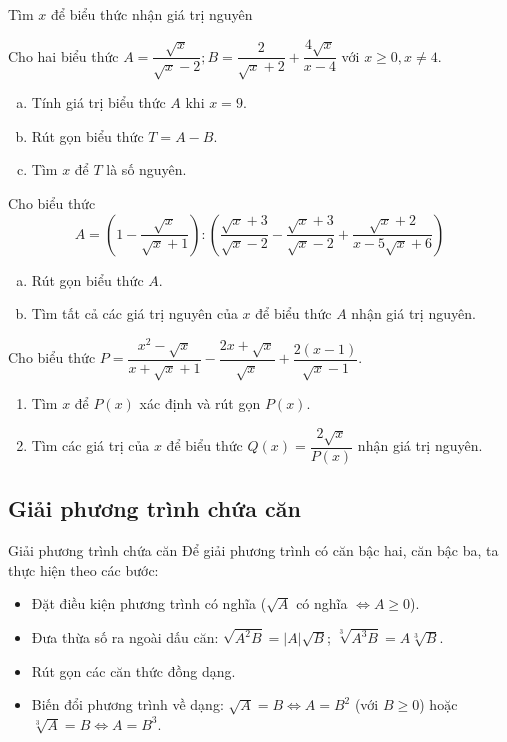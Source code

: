 \begin{dang}{Tìm $x$ để biểu thức nhận giá trị nguyên}

\end{dang}
\begin{vd}
	Cho hai biểu thức $A=\dfrac{\sqrt{x}}{\sqrt{x}-2};B=\dfrac{2}{\sqrt{x}+2}+\dfrac{4\sqrt{x}}{x-4}$ với $x\geq0,x\neq4$.
	\begin{enumerate}[a)]
		\item Tính giá trị biểu thức $A$ khi $x=9$.
		\item Rút gọn biểu thức $T=A-B$.
		\item Tìm $x$ để $T$ là số nguyên.
	\end{enumerate}

\end{vd}
\begin{vd}
	Cho biểu thức $$A=\left(1-\dfrac{\sqrt{x}}{\sqrt{x}+1}\right):\left(\dfrac{\sqrt{x}+3}{\sqrt{x}-2}-\dfrac{\sqrt{x}+3}{\sqrt{x}-2}+\dfrac{\sqrt{x}+2}{x-5\sqrt{x}+6}\right)$$
	\begin{enumerate}[a)]
		\item Rút gọn biểu thức $A$.
		\item Tìm tất cả các giá trị nguyên của $x$ để biểu thức $A$ nhận giá trị nguyên.
	\end{enumerate}

\end{vd}
\begin{vd}
	\hfill
	Cho biểu thức $P = \dfrac{x^2-\sqrt{x}}{x+\sqrt{x}+1}-\dfrac{2x+\sqrt{x}}{\sqrt{x}}+\dfrac{2(x-1)}{\sqrt{x}-1}$.
	\begin{enumerate}
		\item Tìm $x$ để $P(x)$ xác định và rút gọn $P(x)$.
		\item Tìm các giá trị của $x$ để biểu thức $Q(x) = \dfrac{2\sqrt{x}}{P(x)}$ nhận giá trị nguyên.
	\end{enumerate}
\end{vd}
\subsection{Giải phương trình chứa căn}

\begin{dang}{Giải phương trình chứa căn}
	Để giải phương trình có căn bậc hai, căn bậc ba, ta thực hiện theo các bước:
	\begin{itemize}
		\item Đặt điều kiện phương trình có nghĩa ($\sqrt{A}$ có nghĩa $\Leftrightarrow A\geq 0$).
		\item Đưa thừa số ra ngoài dấu căn: $\sqrt{A^2B}=|A|\sqrt{B}$; $\sqrt[3]{A^3B}=A\sqrt[3]{B}$.
		\item Rút gọn các căn thức đồng dạng.
		\item Biến đổi phương trình về dạng: $\sqrt{A}=B \Leftrightarrow A=B^2$ (với $B\geq 0$) hoặc\\ $\sqrt[3]{A}=B \Leftrightarrow A=B^3$.
	\end{itemize}
\end{dang}

